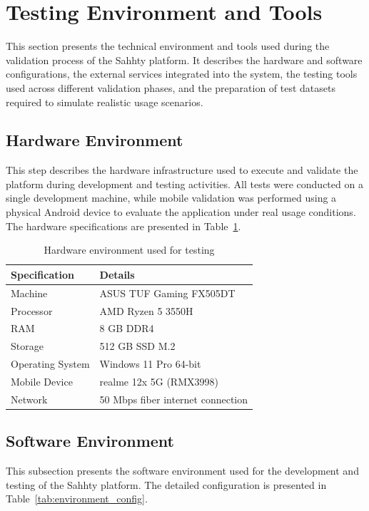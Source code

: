 \section{Testing Environment and Tools}
This section presents the technical environment and tools used during the validation process of the Sahhty platform. It describes the hardware and software configurations, the external services integrated into the system, the testing tools used across different validation phases, and the preparation of test datasets required to simulate realistic usage scenarios.

\subsection{Hardware Environment}
This step describes the hardware infrastructure used to execute and validate the platform during development and testing activities. All tests were conducted on a single development machine, while mobile validation was performed using a physical Android device to evaluate the application under real usage conditions. The hardware specifications are presented in Table~\ref{tab:hardware_env}.

\begin{table}[H]
\centering
\caption{Hardware environment used for testing}
\label{tab:hardware_env}
\begin{tabular}{|p{4cm}|p{7cm}|}
\hline
\textbf{Specification} & \textbf{Details} \\
\hline
Machine & ASUS TUF Gaming FX505DT \\
\hline
Processor & AMD Ryzen 5 3550H \\
\hline
RAM & 8 GB DDR4 \\
\hline
Storage & 512 GB SSD M.2 \\
\hline
Operating System & Windows 11 Pro 64-bit \\
\hline
Mobile Device & realme 12x 5G (RMX3998) \\
\hline
Network & 50 Mbps fiber internet connection \\
\hline
\end{tabular}
\end{table}

\subsection{Software Environment}
This subsection presents the software environment used for the development and testing of the Sahhty platform. The detailed configuration is presented in Table~\ref{tab:environment_config}.


